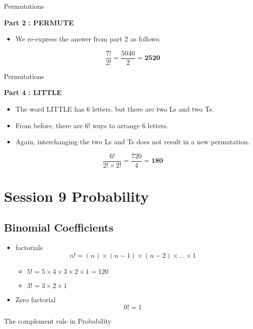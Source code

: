 {Permutations}

\textbf{Part 2 : PERMUTE}\\
\begin{itemize}
\item We re-express the answer from part 2 as follows:

\[\frac{7!}{2!} =  \frac{5040}{2} = \boldsymbol{2520} \]
\end{itemize}


{Permutations}

\textbf{Part 4 : LITTLE}\\
\begin{itemize}
\item The word LITTLE has 6 letters, but there are two Ls and two Ts.
\item From before, there are 6! ways to arrange 6 letters.
\item Again, interchanging the two Ls and Ts does not result in a new permutation. 

\[\frac{6!}{2!\times 2!} =  \frac{720}{4} = \boldsymbol{180} \]
\end{itemize}

\section*{Session 9 Probability}
\subsection*{Binomial Coefficients}
\begin{itemize}
\item factorials 
\[ n! = (n)\times (n-1)\times(n-2) \times \ldots \times 1 \]
\begin{itemize}
\item $5! = 5 \times 4 \times 3 \times 2 \times 1 = 120 $
\item $3! = 3 \times 2 \times 1$
\end{itemize}
\item Zero factorial
\[ 0! =  1 \]
\end{itemize}


The complement rule in Probability

